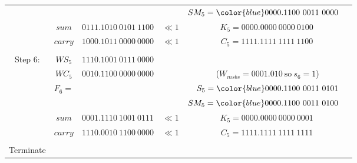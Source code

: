 \documentclass[12pt]{article}
\begin{document}
{\begin{center}
\begin{tabular}{ccccc}
            &                &                                   &          &$SM_5={\color{blue}0000.1100\ 0011\ 00}00\phantom{M}$\\
    \cline{2-3}
            &$sum           $&$         0111.1010\ 0101\ 1100   $&$\ll1    $&$K_5=0000.0000\ 0000\ 0100\ $\\
            &$carry         $&$         1000.1011\ 0000\ 0000   $&$\ll1    $&$C_5=1111.1111\ 1111\ 1100\,$\\
    \hdashline\\
    Step 6: &$WS_5          $&$         1110.1001\ 0111\ 0000   $&          &\\
            &$WC_5          $&$         0010.1100\ 0000\ 0000   $&          &($W_{msbs}=0001.010\ \text{so}\ s_6=1$)\\
            &$F_6=          $&$                                 $&          &$S_5={\color{blue}0000.1100\ 0011\ 0101}$\\
            &                &                                   &          &$SM_5={\color{blue}0000.1100\ 0011\ 0100}\phantom{M}$\\
    \cline{2-3}
            &$sum           $&$         0001.1110\ 1001\ 0111   $&$\ll1    $&$K_5=0000.0000\ 0000\ 0001\ $\\
            &$carry         $&$         1110.0010\ 1100\ 0000   $&$\ll1    $&$C_5=1111.1111\ 1111\ 1111\,$\\
    \hdashline\\
    Terminate
\end{tabular}
\end{center}
}
\end{document}
